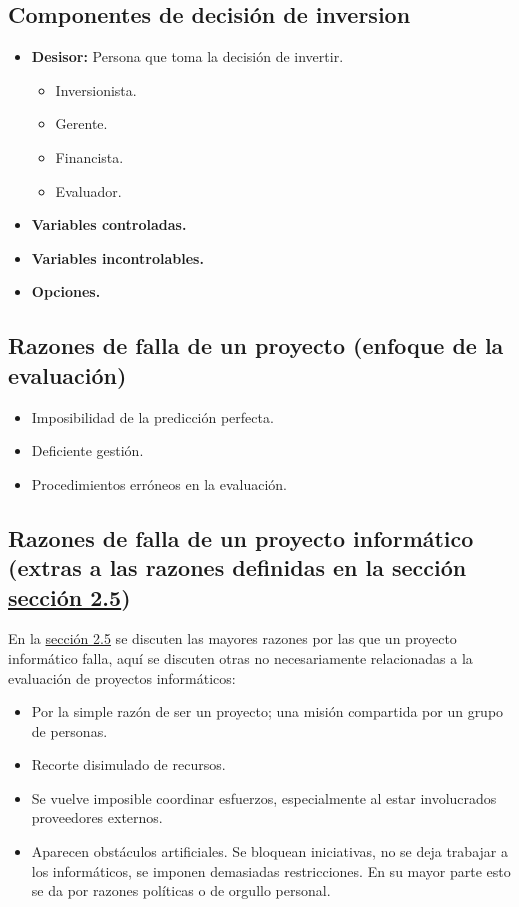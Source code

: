\documentclass{templateNote}
\begin{document}
\subsection*{Componentes de decisión de inversion}
\begin{itemize}
    \item \textbf{Desisor:} Persona que toma la decisión de invertir.
    \begin{itemize}
        \item Inversionista.
        \item Gerente.
        \item Financista.
        \item Evaluador.
    \end{itemize}
    \item \textbf{Variables controladas.}
    \item \textbf{Variables incontrolables.}
    \item \textbf{Opciones.}
\end{itemize}

\subsection*{Razones de falla de un proyecto (enfoque de la evaluación)}
\begin{itemize}
    \item Imposibilidad de la predicción perfecta.
    \item Deficiente gestión.
    \item Procedimientos erróneos en la evaluación.
\end{itemize}

\subsection*{Razones de falla de un proyecto informático (extras a las razones definidas en la sección \hyperref[sec:razones-falla]{sección 2.5})}
En la \hyperref[sec:razones-falla]{sección 2.5} se discuten las mayores razones por las que un proyecto informático falla, aquí se discuten otras no necesariamente relacionadas a la evaluación de proyectos informáticos:
\begin{itemize}
    \item Por la simple razón de ser un proyecto; una misión compartida por un grupo de personas.
    \item Recorte disimulado de recursos.
    \item Se vuelve imposible coordinar esfuerzos, especialmente al estar involucrados proveedores externos.
    \item Aparecen obstáculos artificiales. Se bloquean iniciativas, no se deja trabajar a los informáticos, se imponen demasiadas restricciones. En su mayor parte esto se da por razones políticas o de orgullo personal.
\end{itemize}
\end{document}
